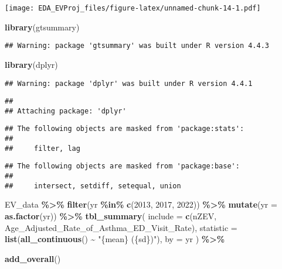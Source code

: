 \documentclass[
]{article}
\newenvironment{Shaded}{\begin{snugshade}}{\end{snugshade}}
\newcommand{\AttributeTok}[1]{\textcolor[rgb]{0.13,0.29,0.53}{#1}}
\newcommand{\DecValTok}[1]{\textcolor[rgb]{0.00,0.00,0.81}{#1}}
\newcommand{\FunctionTok}[1]{\textcolor[rgb]{0.13,0.29,0.53}{\textbf{#1}}}
\newcommand{\NormalTok}[1]{#1}
\newcommand{\SpecialCharTok}[1]{\textcolor[rgb]{0.81,0.36,0.00}{\textbf{#1}}}
\newcommand{\StringTok}[1]{\textcolor[rgb]{0.31,0.60,0.02}{#1}}
\begin{document}
\texttt{[image: EDA\_EVProj\_files/figure-latex/unnamed-chunk-14-1.pdf]}

\begin{Shaded}
\begin{Highlighting}[]
\FunctionTok{library}\NormalTok{(gtsummary)}
\end{Highlighting}
\end{Shaded}

\begin{verbatim}
## Warning: package 'gtsummary' was built under R version 4.4.3
\end{verbatim}

\begin{Shaded}
\begin{Highlighting}[]
\FunctionTok{library}\NormalTok{(dplyr)}
\end{Highlighting}
\end{Shaded}

\begin{verbatim}
## Warning: package 'dplyr' was built under R version 4.4.1
\end{verbatim}

\begin{verbatim}
## 
## Attaching package: 'dplyr'
\end{verbatim}

\begin{verbatim}
## The following objects are masked from 'package:stats':
## 
##     filter, lag
\end{verbatim}

\begin{verbatim}
## The following objects are masked from 'package:base':
## 
##     intersect, setdiff, setequal, union
\end{verbatim}

\begin{Shaded}
\begin{Highlighting}[]
\NormalTok{EV\_data }\SpecialCharTok{\%\textgreater{}\%}
  \FunctionTok{filter}\NormalTok{(yr }\SpecialCharTok{\%in\%} \FunctionTok{c}\NormalTok{(}\DecValTok{2013}\NormalTok{, }\DecValTok{2017}\NormalTok{, }\DecValTok{2022}\NormalTok{)) }\SpecialCharTok{\%\textgreater{}\%}
  \FunctionTok{mutate}\NormalTok{(}\AttributeTok{yr =} \FunctionTok{as.factor}\NormalTok{(yr)) }\SpecialCharTok{\%\textgreater{}\%}
  \FunctionTok{tbl\_summary}\NormalTok{(}
    \AttributeTok{include =} \FunctionTok{c}\NormalTok{(nZEV, Age\_Adjusted\_Rate\_of\_Asthma\_ED\_Visit\_Rate),}
    \AttributeTok{statistic =} \FunctionTok{list}\NormalTok{(}\FunctionTok{all\_continuous}\NormalTok{() }\SpecialCharTok{\textasciitilde{}} \StringTok{"\{mean\} (\{sd\})"}\NormalTok{),}
    \AttributeTok{by =}\NormalTok{ yr}
\NormalTok{  ) }\SpecialCharTok{\%\textgreater{}\%}
  
  \FunctionTok{add\_overall}\NormalTok{()}
\end{Highlighting}
\end{Shaded}
\end{document}
